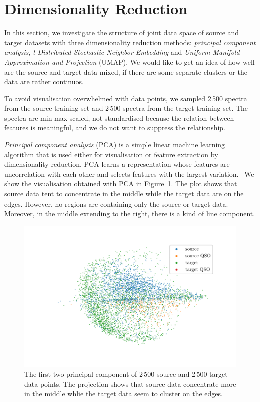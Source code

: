 \section{Dimensionality Reduction}

In this section, we investigate the structure of joint data space of source and target datasets with three dimensionality reduction methods:
\textit{principal component analysis},
\textit{t-Distributed Stochastic Neighbor Embedding}
and \textit{Uniform Manifold Approximation and Projection} (UMAP).
We would like to get an idea of how well are the source and target data mixed,
if there are some separate clusters or the data are rather continuos.

To avoid visualisation overwhelmed with data points,
we sampled 2\,500 spectra from the source training set
and 2\,500 spectra from the target training set.
The spectra are min-max scaled, not standardised
because the relation between features is meaningful,
and we do not want to suppress the relationship.

\textit{Principal component analysis} (PCA) is a simple linear machine learning algorithm
that is used either for visualisation or feature extraction by dimensionality reduction.
PCA learns a representation whose features are uncorrelation with each other
and selects features with the largest variation.~\cite{goodfellow2016}
We show the visualisation obtained with PCA in Figure~\ref{pca}.
The plot shows that source data tent to concentrate in the middle
while the target data are on the edges.
However, no regions are containing only the source or target data.
Moreover, in the middle extending to the right, there is a kind of line component.

\begin{figure}
\includegraphics[width=\textwidth]{img/pca.pdf}
\caption[PCA visualisation of source and target data distributions]{
	The first two principal component of 2\,500 source
	and 2\,500 target data points.
	The projection shows that source data concentrate more in the middle
	whlie the target data seem to cluster on the edges.
	}
\label{pca}
\end{figure}

